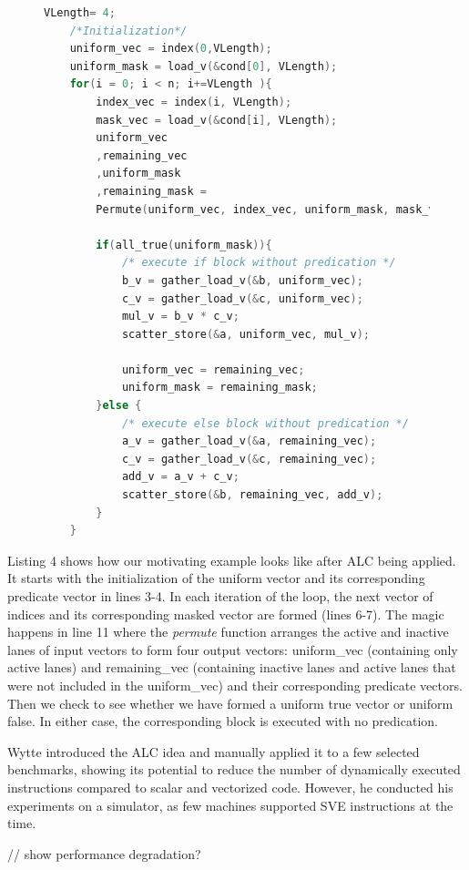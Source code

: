 \begin{figure}[t]
\begin{lstlisting}[language=C, caption={Applying ALC}]
    VLength= 4;
    /*Initialization*/
    uniform_vec = index(0,VLength);
    uniform_mask = load_v(&cond[0], VLength);
    for(i = 0; i < n; i+=VLength ){
        index_vec = index(i, VLength);
        mask_vec = load_v(&cond[i], VLength);
        uniform_vec 
        ,remaining_vec
        ,uniform_mask
        ,remaining_mask =
        Permute(uniform_vec, index_vec, uniform_mask, mask_vec); 
                
        if(all_true(uniform_mask)){
            /* execute if block without predication */
            b_v = gather_load_v(&b, uniform_vec);
            c_v = gather_load_v(&c, uniform_vec);
            mul_v = b_v * c_v;
            scatter_store(&a, uniform_vec, mul_v);

            uniform_vec = remaining_vec;
            uniform_mask = remaining_mask;
        }else {     
            /* execute else block without predication */
            a_v = gather_load_v(&a, remaining_vec);
            c_v = gather_load_v(&c, remaining_vec);
            add_v = a_v + c_v;
            scatter_store(&b, remaining_vec, add_v);
        } 
    }
\end{lstlisting}
\label{fig:mycode}
\end{figure}

Listing 4 shows how our motivating example looks like after ALC being applied. It starts with the initialization of the uniform vector and its corresponding predicate vector in lines 3-4. In each iteration of the loop, the next vector of indices and its corresponding masked vector are formed (lines 6-7). The magic happens in line 11 where the \emph{permute} function arranges the active and inactive lanes of input vectors to form four output vectors: uniform\_vec
(containing only active lanes) and remaining\_vec (containing inactive lanes and active lanes that were not included in the uniform\_vec) and their corresponding predicate vectors. Then we check to see whether we have formed a uniform true vector or uniform false. In either case, the corresponding block is executed with no predication.  

Wytte introduced the ALC idea and manually applied it to a few
selected benchmarks, showing its potential to reduce the number of dynamically executed instructions compared to scalar and vectorized code. However, he conducted his experiments on a simulator, as few machines supported SVE instructions at the time.

// show performance degradation?
\fi